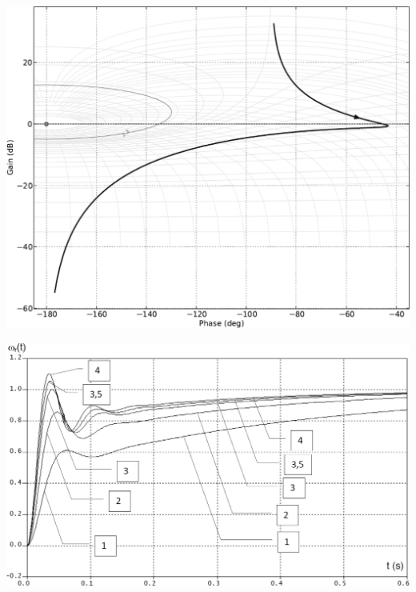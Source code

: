 \documentclass[10pt,fleqn]{article} %
\begin{document}
\begin{center}
\end{center}
\begin{center}
\includegraphics[width=\linewidth]{images/dr_02.png}
\end{center}
\begin{center}
\includegraphics[width=\linewidth]{images/dr_03.png}
\end{center}
\end{document}
